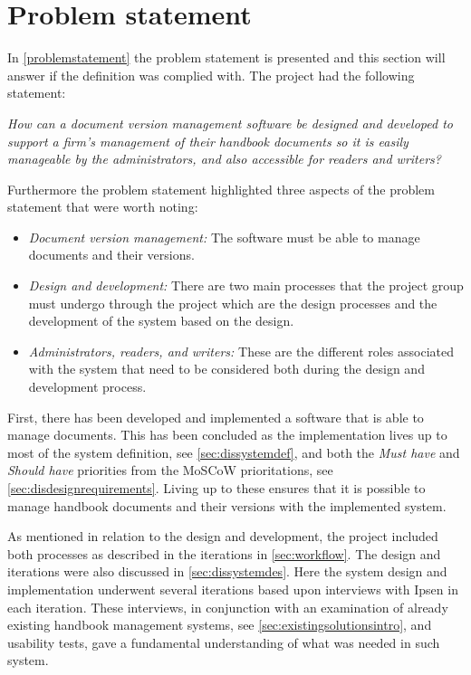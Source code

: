 \section{Problem statement}
In \cref{problemstatement} the problem statement is presented and this section will answer if the definition was complied with.
The project had the following statement:

\begin{center}
\textit{How can a document version management software be designed and developed to support a firm's management of their handbook documents so it is easily manageable by the administrators, and also accessible for readers and writers?}
\end{center}

Furthermore the problem statement highlighted three aspects of the problem statement that were worth noting:

\begin{itemize}
	\item
		\textit{Document version management:}
		The software must be able to manage documents and their versions.
	\item
		\textit{Design and development:}
		There are two main processes that the project group must undergo through the project which are the design processes and the development of the system based on the design.
	\item
		\textit{Administrators, readers, and writers:}
		These are the different roles associated with the system that need to be considered both during the design and development process.

\end{itemize}

First, there has been developed and implemented a software that is able to manage documents.
This has been concluded as the implementation lives up to most of the system definition, see \cref{sec:dissystemdef}, and both the \textit{Must have} and \textit{Should have} priorities from the MoSCoW prioritations, see \cref{sec:disdesignrequirements}.
Living up to these ensures that it is possible to manage handbook documents and their versions with the implemented system.

As mentioned in relation to the design and development, the project included both processes as described in the iterations in \cref{sec:workflow}.
The design and iterations were also discussed in {\color{red}\cref{sec:dissystemdes}}.
Here the system design and implementation underwent several iterations based upon interviews with Ipsen in each iteration.
These interviews, in conjunction with an examination of already existing handbook management systems, see \cref{sec:existingsolutionsintro}, and usability tests, gave a fundamental understanding of what was needed in such system.

